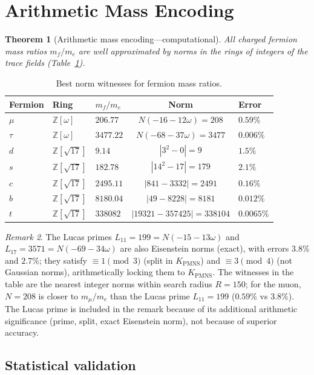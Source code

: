 \documentclass[11pt,a4paper]{article}
\newtheorem{theorem}{Theorem}
\theoremstyle{definition}
\theoremstyle{remark}
\newtheorem{remark}[theorem]{Remark}
\newcommand{\KPMNS}{K_{\mathrm{PMNS}}}
\newcommand{\Zom}{\mathbb{Z}[\omega]}
\newcommand{\Zsev}{\mathbb{Z}[\sqrt{17}]}
\begin{document}
\section{Arithmetic Mass Encoding}
\label{sec:mass}

\begin{theorem}[Arithmetic mass encoding---computational]
\label{thm:mass}
All charged fermion mass ratios $m_f/m_e$ are well approximated by
norms in the rings of integers of the trace fields
(Table~\ref{tab:witnesses}).
\end{theorem}

\begin{table}[htbp]
\centering
\caption{Best norm witnesses for fermion mass ratios.}
\label{tab:witnesses}
\begin{tabular}{lllcl}
\toprule
Fermion & Ring & $m_f/m_e$ & Norm & Error \\
\midrule
$\mu$  & $\Zom$ & $206.77$ & $N(-16-12\omega)=208$ & $0.59\%$ \\
$\tau$ & $\Zom$ & $3477.22$ & $N(-68-37\omega)=3477$ & $0.006\%$ \\
\midrule
$d$ & $\Zsev$ & $9.14$  & $|3^2-0|=9$ & $1.5\%$ \\
$s$ & $\Zsev$ & $182.78$ & $|14^2-17|=179$ & $2.1\%$ \\
$c$ & $\Zsev$ & $2495.11$ & $|841-3332|=2491$ & $0.16\%$ \\
$b$ & $\Zsev$ & $8180.04$ & $|49-8228|=8181$ & $0.012\%$ \\
$t$ & $\Zsev$ & $338082$ & $|19321-357425|=338104$ & $0.0065\%$ \\
\bottomrule
\end{tabular}
\end{table}

\begin{remark}
The Lucas primes $L_{11}=199=N(-15-13\omega)$ and
$L_{17}=3571=N(-69-34\omega)$ are also Eisenstein norms (exact),
with errors $3.8\%$ and $2.7\%$; they satisfy $\equiv1\pmod3$
(split in $\KPMNS$) and $\equiv3\pmod4$ (not Gaussian norms),
arithmetically locking them to $\KPMNS$.
The witnesses in the table are the nearest integer norms within
search radius $R=150$; for the muon, $N=208$ is closer to $m_\mu/m_e$
than the Lucas prime $L_{11}=199$ ($0.59\%$ vs $3.8\%$).
The Lucas prime is included in the remark because of its additional
arithmetic significance (prime, split, exact Eisenstein norm),
not because of superior accuracy.
\end{remark}

\subsection{Statistical validation}
\end{document}
